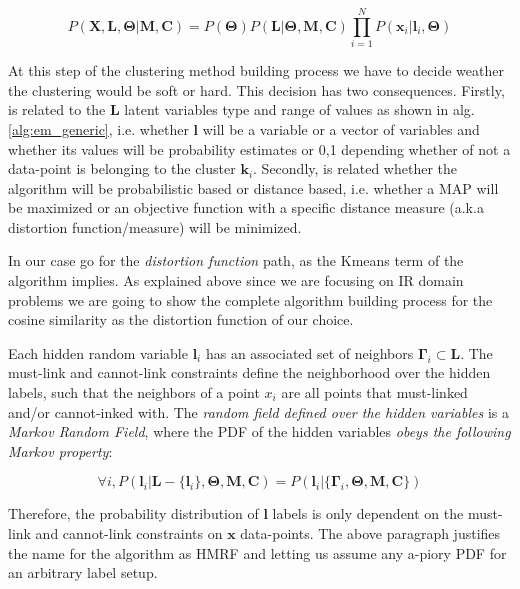 \documentclass[dvips,dvipdfm,pdftex]{llncs}
\begin{document}
\begin{equation}
	P(\mathbf{X,L,\Theta}|\mathbf{M,C})=P(\mathbf{\Theta})P(\mathbf{L}|\mathbf{\Theta,M,C})\prod_{i=1}^{N}P(\mathbf{x}_{i}|\mathbf{l}_{i},\mathbf{\Theta})
\label{eq:hmrm_em_MAP_or_MAX_Liklihood}
\end{equation}

At this step of the clustering method building process we have to decide weather the clustering would be soft or hard. This decision has two consequences. Firstly, is related to the $\mathbf{L}$ latent variables type and range of values as shown in alg.\ref{alg:em_generic}, i.e. whether $\mathbf{l}$ will be a variable or a vector of variables and whether its values will be probability estimates or {0,1} depending whether of not a data-point is belonging to the cluster $\mathbf{k}_{i}$. Secondly, is related whether the algorithm will be probabilistic based or distance based, i.e. whether a MAP will be maximized or an objective function with a specific distance measure (a.k.a distortion function/measure) will be minimized.

In our case go for the \emph{distortion function} path, as the Kmeans term of the algorithm implies. As explained above since we are focusing on IR domain problems we are going to show the complete algorithm building process for the cosine similarity as the distortion function of our choice.

Each hidden random variable $\mathbf{l}_i$ has an associated set of neighbors $\mathbf{\Gamma}_{i}\subset\mathbf{L}$. The must-link and cannot-link constraints define the neighborhood over the hidden labels, such that the neighbors of a point $x_{i}$ are all points that must-linked and/or cannot-inked with. The \emph{random field defined over the hidden variables} is a \emph{Markov Random Field}, where the PDF of the hidden variables \emph{obeys the following Markov property}:

\begin{equation}
	\forall i,P(\mathbf{l}_{i}|\mathbf{L-}\{\mathbf{l}_{i}\},\mathbf{\Theta},\mathbf{M},\mathbf{C})=P(\mathbf{l}_{i}|\{\mathbf{\Gamma}_{i},\mathbf{\Theta},\mathbf{M},\mathbf{C}\})
\label{eq:markov_property}
\end{equation}

Therefore, the probability distribution of $\mathbf{l}$ labels is only dependent on the must-link and cannot-link constraints on $\mathbf{x}$ data-points. The above paragraph justifies the name for the algorithm as HMRF and letting us assume any a-piory PDF for an arbitrary label setup.
\end{document}
